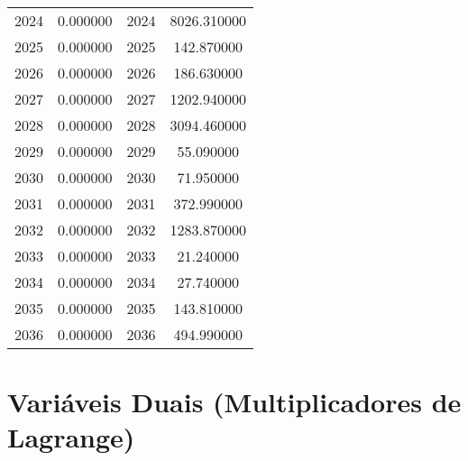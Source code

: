 \documentclass[12pt]{article}
\begin{document}
\begin{longtable}{@{}cccc@{}}
2024 & 0.000000 & 2024 & 8026.310000 \\
2025 & 0.000000 & 2025 & 142.870000 \\
2026 & 0.000000 & 2026 & 186.630000 \\
2027 & 0.000000 & 2027 & 1202.940000 \\
2028 & 0.000000 & 2028 & 3094.460000 \\
2029 & 0.000000 & 2029 & 55.090000 \\
2030 & 0.000000 & 2030 & 71.950000 \\
2031 & 0.000000 & 2031 & 372.990000 \\
2032 & 0.000000 & 2032 & 1283.870000 \\
2033 & 0.000000 & 2033 & 21.240000 \\
2034 & 0.000000 & 2034 & 27.740000 \\
2035 & 0.000000 & 2035 & 143.810000 \\
2036 & 0.000000 & 2036 & 494.990000 \\

\end{longtable}

\section{Variáveis Duais (Multiplicadores de Lagrange)}
\end{document}
